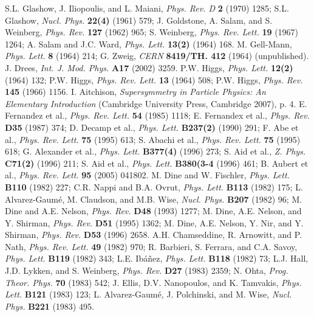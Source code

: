 \documentclass[12pt, letterpaper]{report}
\begin{document}
\begin{thebibliography}{99}
 S.L. Glashow, J. Iliopoulis, and L. Maiani, \textit{Phys. Rev. D} \textbf{2} (1970) 1285; S.L. Glashow, \textit{Nucl. Phys.} \textbf{22(4)} (1961) 579; J. Goldstone, A. Salam, and S. Weinberg, \textit{Phys. Rev.} \textbf{127} (1962) 965; S. Weinberg, \textit{Phys. Rev. Lett.} \textbf{19} (1967) 1264; A. Salam and J.C. Ward, \textit{Phys. Lett.} \textbf{13(2)} (1964) 168.
 M. Gell-Mann, \textit{Phys. Lett.} \textbf{8} (1964) 214; G. Zweig, \textit{CERN} \textbf{8419/TH. 412} (1964) (unpublished).
 J. Drees, \textit{Int. J. Mod. Phys.} \textbf{A17} (2002) 3259.
 P.W. Higgs, \textit{Phys. Lett.} \textbf{12(2)} (1964) 132; P.W. Higgs, \textit{Phys. Rev. Lett.} \textbf{13} (1964) 508; P.W. Higgs, \textit{Phys. Rev.} \textbf{145} (1966) 1156.
 I. Aitchison, \textit{Supersymmetry in Particle Physics: An Elementary Introduction} (Cambridge University Press, Cambridge 2007), p. 4.
 E. Fernandez et al., \textit{Phys. Rev. Lett.} \textbf{54} (1985) 1118; E. Fernandex et al., \textit{Phys. Rev.} \textbf{D35} (1987) 374; D. Decamp et al., \textit{Phys. Lett.} \textbf{B237(2)} (1990) 291; F. Abe et al., \textit{Phys. Rev. Lett.} \textbf{75} (1995) 613; S. Abachi et al., \textit{Phys. Rev. Lett.} \textbf{75} (1995) 618; G. Alexander et al., \textit{Phys. Lett.} \textbf{B377(4)} (1996) 273; S. Aid et al., \textit{Z. Phys.} \textbf{C71(2)} (1996) 211; S. Aid et al., \textit{Phys. Lett.} \textbf{B380(3-4} (1996) 461; B. Aubert et al., \textit{Phys. Rev. Lett.} \textbf{95} (2005) 041802.
 M. Dine and W. Fischler, \textit{Phys. Lett.} \textbf{B110} (1982) 227; C.R. Nappi and B.A. Ovrut, \textit{Phys. Lett.} \textbf{B113} (1982) 175; L. Alvarez-Gaum\'e, M. Claudson, and M.B. Wise, \textit{Nucl. Phys.} \textbf{B207} (1982) 96; M. Dine and A.E. Nelson, \textit{Phys. Rev.} \textbf{D48} (1993) 1277; M. Dine, A.E. Nelson, and Y. Shirman, \textit{Phys. Rev.} \textbf{D51} (1995) 1362; M. Dine, A.E. Nelson, Y. Nir, and Y. Shirman, \textit{Phys. Rev.} \textbf{D53} (1996) 2658.
 A.H. Chamseddine, R. Arnowitt, and P. Nath, \textit{Phys. Rev. Lett.} \textbf{49} (1982) 970; R. Barbieri, S. Ferrara, and C.A. Savoy, \textit{Phys. Lett.} \textbf{B119} (1982) 343; L.E. Ib\'a\~{n}ez, \textit{Phys. Lett.} \textbf{B118} (1982) 73; L.J. Hall, J.D. Lykken, and S. Weinberg, \textit{Phys. Rev.} \textbf{D27} (1983) 2359; N. Ohta, \textit{Prog. Theor. Phys.} \textbf{70} (1983) 542; J. Ellis, D.V. Nanopoulos, and K. Tamvakis, \textit{Phys. Lett.} \textbf{B121} (1983) 123; L. Alvarez-Gaum\'e, J. Polchinski, and M. Wise, \textit{Nucl. Phys.} \textbf{B221} (1983) 495.

\end{thebibliography}
\end{document}
